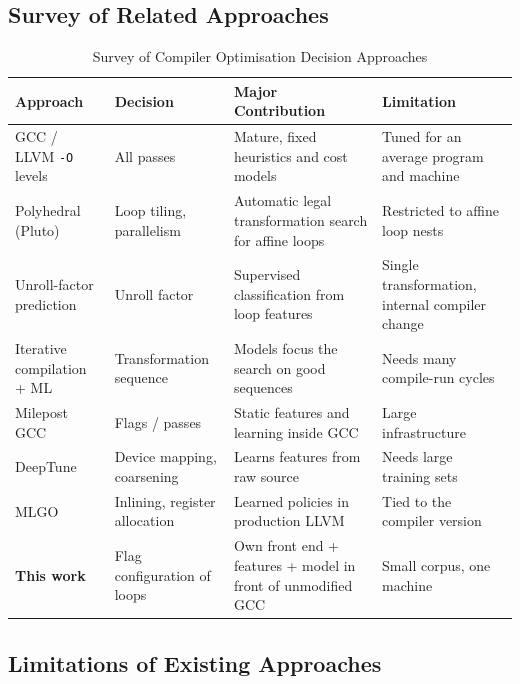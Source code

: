 \documentclass[12pt,a4paper]{article}
\begin{document}
\subsection{Survey of Related Approaches}

\begin{table}[H]
\centering
\caption{Survey of Compiler Optimisation Decision Approaches}
\label{tab:survey}
\small
\begin{tabularx}{\textwidth}{p{2.6cm}p{2.5cm}X p{2.9cm}}
\toprule
\textbf{Approach} & \textbf{Decision} & \textbf{Major Contribution} &
\textbf{Limitation}\\
\midrule

GCC / LLVM \texttt{-O} levels
& All passes
& Mature, fixed heuristics and cost models
& Tuned for an average program and machine\\

Polyhedral (Pluto)
& Loop tiling, parallelism
& Automatic legal transformation search for affine loops
& Restricted to affine loop nests\\

Unroll-factor prediction \cite{stephenson2005}
& Unroll factor
& Supervised classification from loop features
& Single transformation, internal compiler change\\

Iterative compilation + ML \cite{agakov2006}
& Transformation sequence
& Models focus the search on good sequences
& Needs many compile-run cycles\\

Milepost GCC \cite{fursin2011}
& Flags / passes
& Static features and learning inside GCC
& Large infrastructure\\

DeepTune \cite{cummins2017}
& Device mapping, coarsening
& Learns features from raw source
& Needs large training sets\\

MLGO \cite{trofin2021}
& Inlining, register allocation
& Learned policies in production LLVM
& Tied to the compiler version\\

\textbf{This work}
& Flag configuration of loops
& Own front end + features + model in front of unmodified GCC
& Small corpus, one machine\\

\bottomrule
\end{tabularx}
\end{table}

\subsection{Limitations of Existing Approaches}
\end{document}
